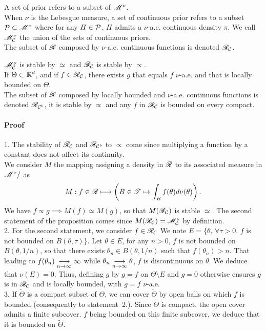 \begin{defi}
    A set of prior refers to a subset of $\mathscr{M}^\nu$.\\
    When $\nu$ is the Lebesgue measure, a set of continuous prior refers to a subset $\mathcal{P}\subset\mathscr{M}^\nu$ where for any $\varPi\in\mathcal{P}$, $\varPi$ admits a $\nu$-a.e. continuous density $\pi$. We call $\mathscr{M}_{\mathcal{C}}^\nu$ the union of the sets of continuous priors.\\
    The subset of $\mathscr{R}$ composed by $\nu$-a.e. continuous functions is denoted $\mathscr{R}_{\mathcal{C}}$.
\end{defi}

\begin{prop}
    $\mathscr{M}_{\mathcal{C}}^\nu$ is stable by $\simeq$ and $\mathscr{R}_{\mathcal{C}}$ is stable by $\propto$.\\
    If $\Theta\subset\mathbb{R}^d$, and if $f\in\mathscr{R}_{\mathcal{C}}$, there exists $g$ that equals $f$ $\nu$-a.e. and that is locally bounded on $\Theta$.\\
    The subset of $\mathscr{R}$ composed by locally bounded and $\nu$-a.e. continuous functions is denoted $\mathscr{R}_{\mathcal{C}^b}$, it is stable by $\propto$ and any $f$ in $\mathscr{R}_{\mathcal{C}}$ is bounded on every compact.
\end{prop}

\paragraph{Proof} 1.
The stability of $\mathscr{R}_{\mathcal{C}}$ and $\mathscr{R}_{\mathcal{C}^b}$ to $\propto$ come since multiplying a function by a constant does not affect its continuity. \\
We consider $M$ the mapping assigning a density in $\mathscr{R}$ to its associated measure in $\mathscr{M}^\nu/$ as
\begin{equation}
    M:f\in\mathscr{R} \longmapsto \left(B\in\mathscr{T}\mapsto \int_Bf(\theta)d\nu(\theta) \right).
\end{equation}
We have $f\propto g\implies M(f)\simeq M(g)$, so that $M(\mathscr{R}_{\mathcal{C}}) $ is stable $\simeq$. The second statement of the proposition comes since $M(\mathscr{R}_{\mathcal{C}})=\mathscr{M}^\nu_{\mathcal{C}}$ by definition.\\
2. For the second statement, we consider $f\in\mathscr{R}_{\mathcal{C}}$
We note $E=\{\theta,\, \forall\tau>0,\, f$ is not bounded on $B(\theta,\tau) \} $.
Let $\theta\in E$, 
for any $n>0$, $f$ is not bounded on $B(\theta,1/n)$, so that there exists $\theta_n\in B(\theta,1/n)$ such that $f(\theta_n)>n$. That leading to $f(\theta_n)\overset{\ }{\underset{n\rightarrow\infty}{\longrightarrow}}\infty$ while $\theta_n\overset{\ }{\underset{n\rightarrow\infty}{\longrightarrow}}\theta$, $f$ is discontinuous on $\theta$. 
We deduce that $\nu(E)=0$. Thus, defining $g$ by $g=f$ on $\Theta\!\setminus\! E$ and $g=0$ otherwise ensures $g$ is in $\mathscr{R}_{\mathcal{C}}$ and is locally bounded, with $g=f$ $\nu$-a.e. \\
3. If $\tilde\Theta$ is a compact subset of $\Theta$, we can cover $\tilde\Theta$ by open balls on which $f$ is bounded (consequently to statement~2.). Since $\tilde\Theta$ is compact, the open cover admits a finite  subcover. $f$ being bounded on this finite subcover, we deduce that it is bounded on $\tilde\Theta$.


